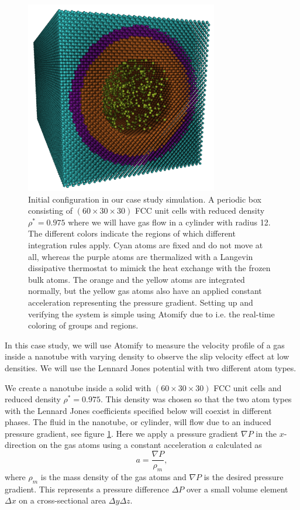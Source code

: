 \documentclass[12pt,a4paper,final]{iopart}
\begin{document}
\begin{figure}
	\centering
	\includegraphics[width=0.75\textwidth]{lj_flow/configuration.png}
	\caption{
		Initial configuration in our case study simulation.
		A periodic box consisting of $(60\times30\times30)$ FCC unit cells with reduced density $\rho^* = 0.975$ where we will have gas flow in a cylinder with radius 12.
		The different colors indicate the regions of which different integration rules apply.
		Cyan atoms are fixed and do not move at all,
		whereas the purple atoms are thermalized with a Langevin\cite{schneider1978molecular} dissipative thermostat to mimick the heat exchange with the frozen bulk atoms.
		The orange and the yellow atoms are integrated normally, but the yellow gas atoms also have an applied constant acceleration representing the pressure gradient.
		Setting up and verifying the system is simple using Atomify due to i.e. the real-time coloring of groups and regions.
    }
	\label{fig:cylinder_simulation}
\end{figure}

In this case study, we will use Atomify to measure the velocity profile of a
gas inside a nanotube with varying density to observe
the slip velocity effect at low densities.
We will use the Lennard Jones potential with two different atom types.

We create a nanotube inside a solid with  $(60\times30\times30)$ FCC unit cells and reduced density $\rho^* = 0.975$.
This density was chosen so that the two atom types with the Lennard Jones coefficients specified below will coexist in different phases.
The fluid in the nanotube, or cylinder, will flow due to an induced pressure gradient, see figure \ref{fig:cylinder_simulation}.
Here we apply a pressure gradient $\nabla P$ in the $x$-direction on the gas atoms using a constant acceleration $a$ calculated as
\[
    a = \frac{\nabla P}{\rho_m},
\]
where $\rho_m$ is the mass density of the gas atoms and $\nabla P$ is the desired pressure gradient.
This represents a pressure difference $\Delta P$ over a small volume element $\Delta x$ on a cross-sectional area $\Delta y\Delta z$.
\end{document}
